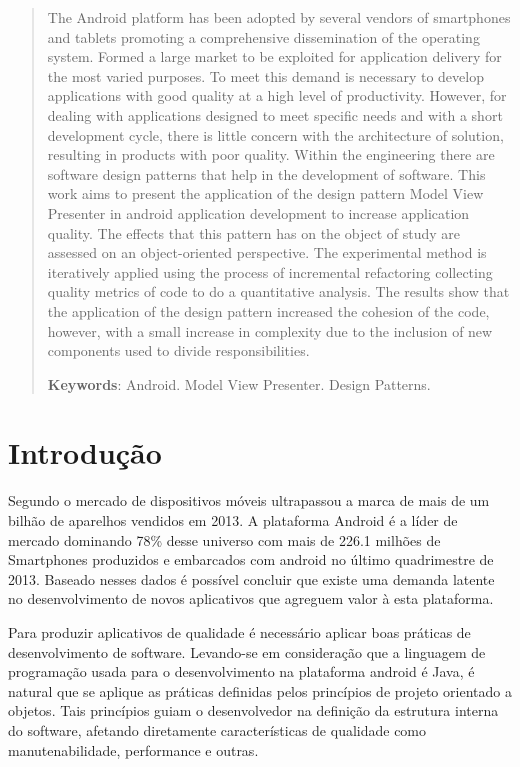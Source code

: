 \documentclass[conference]{IEEEtran}
\begin{document}
\begin{abstract}

The Android platform has been adopted by several vendors of smartphones and
tablets promoting a comprehensive dissemination of the operating system.
Formed a large market to be exploited for application delivery
for the most varied purposes. To meet this demand is necessary to
develop applications with good quality at a high level of productivity.
However, for dealing with applications designed to meet specific needs and with a
short development cycle, there is little concern with the architecture of
solution, resulting in products with poor quality. Within the engineering
there are software design patterns that help in the development of software.
This work aims to present the application of the design pattern
Model View Presenter in android application development to increase
application quality. The effects that this pattern has on the object of study
are assessed on an object-oriented perspective. The experimental method is
iteratively applied using the process of incremental refactoring
collecting quality metrics of code to do a quantitative analysis.
The results show that the application of the design pattern increased the
cohesion of the code, however, with a small increase in complexity due to the
inclusion of new components used to divide responsibilities.


\noindent
\textbf{Keywords}: Android. Model View Presenter. Design Patterns.

\end{abstract}

\section{Introdução}

Segundo \cite{idc} o mercado de dispositivos móveis ultrapassou a marca de mais de um
bilhão de aparelhos vendidos em 2013. A plataforma Android é a líder
de mercado dominando 78\% desse universo com mais de 226.1 milhões de
Smartphones produzidos e embarcados com android no último quadrimestre de 2013.
Baseado nesses dados é possível concluir que existe uma demanda latente no
desenvolvimento de novos aplicativos que agreguem valor à esta plataforma.

Para produzir aplicativos de qualidade é necessário aplicar boas práticas de
desenvolvimento de software. Levando-se em consideração que a linguagem de
programação usada para o desenvolvimento na plataforma android é Java, é
natural que se aplique as práticas definidas pelos princípios de projeto
orientado a objetos. Tais  princípios guiam o desenvolvedor na definição da
estrutura interna do software, afetando diretamente características  de
qualidade como manutenabilidade, performance e outras\cite{tempero-di}.
\end{document}
